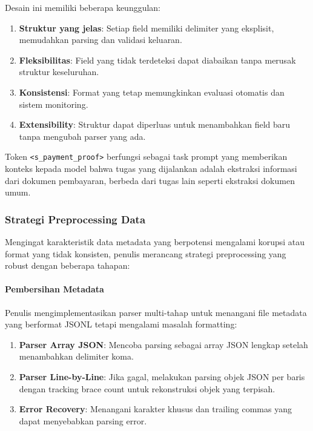 Desain ini memiliki beberapa keunggulan:
\begin{enumerate}
    \item \textbf{Struktur yang jelas}: Setiap field memiliki delimiter yang eksplisit, memudahkan parsing dan validasi keluaran.
    \item \textbf{Fleksibilitas}: Field yang tidak terdeteksi dapat diabaikan tanpa merusak struktur keseluruhan.
    \item \textbf{Konsistensi}: Format yang tetap memungkinkan evaluasi otomatis dan sistem monitoring.
    \item \textbf{Extensibility}: Struktur dapat diperluas untuk menambahkan field baru tanpa mengubah parser yang ada.
\end{enumerate}

Token \texttt{<s\_payment\_proof>} berfungsi sebagai task prompt yang memberikan konteks kepada model bahwa tugas yang dijalankan adalah ekstraksi informasi dari dokumen pembayaran, berbeda dari tugas lain seperti ekstraksi dokumen umum.

\subsubsection{Strategi Preprocessing Data}
\label{subsubsec:strategi-preprocessing-data}

Mengingat karakteristik data metadata yang berpotensi mengalami korupsi atau format yang tidak konsisten, penulis merancang strategi preprocessing yang robust dengan beberapa tahapan:

\paragraph{Pembersihan Metadata}
Penulis mengimplementasikan parser multi-tahap untuk menangani file metadata yang berformat JSONL tetapi mengalami masalah formatting:
\begin{enumerate}
    \item \textbf{Parser Array JSON}: Mencoba parsing sebagai array JSON lengkap setelah menambahkan delimiter koma.
    \item \textbf{Parser Line-by-Line}: Jika gagal, melakukan parsing objek JSON per baris dengan tracking brace count untuk rekonstruksi objek yang terpisah.
    \item \textbf{Error Recovery}: Menangani karakter khusus dan trailing commas yang dapat menyebabkan parsing error.
\end{enumerate}

